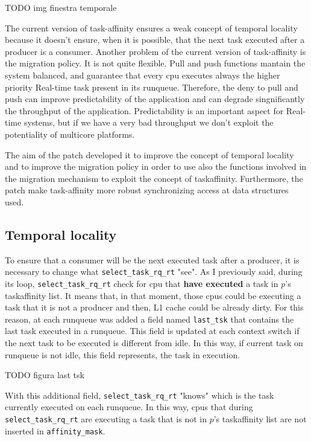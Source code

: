 TODO img finestra temporale

The current version of task-affinity ensures a weak concept of temporal locality because it doesn't ensure, when it is possible, that the next task executed 
after a producer is a consumer. Another problem of the current version of task-affinity is the migration policy. It is not quite flexible. Pull and push 
functions mantain the system balanced, and guarantee that every cpu executes always the higher priority Real-time task present in its runqueue.
Therefore, the deny to pull and push can improve predictability of the application and can degrade singnificantly the throughput of the application.
Predictability is an important aspect for Real-time systems, but if we have a very bad throughput we don't exploit the potentiality of multicore platforms.

The aim of the patch developed it to improve the concept of temporal locality and to improve the migration policy in order to use also the functions 
involved in the migration mechanism to exploit the concept of taskaffinity. Furthermore, the patch make task-affinity more robust synchronizing access at 
data structures used.

\subsection{Temporal locality}

To ensure that a consumer will be the next executed task after a producer, it is necessary to change what \texttt{select\_task\_rq\_rt} "see". As I 
previously said, during its loop, \texttt{select\_task\_rq\_rt} check for cpu that \textbf{have executed} a task in $p$'s taskaffinity list. It means
that, in that moment, those cpus could be executing a task that it is not a producer and then, L1 cache could be already dirty. For this reason, at each
runqueue was added a field named \texttt{last\_tsk} that contains the last task executed in a runqueue. This field is updated at each context switch 
if the next task to be executed is different from idle. In this way, if current task on runqueue is not idle, this field represents, the task in execution. 

TODO figura last tsk

With this additional field, \texttt{select\_task\_rq\_rt} "knows" which is the task currently executed on each runqueue. In this way, cpus that during 
\texttt{select\_task\_rq\_rt} are executing a task that is not in $p$'s taskaffinity list are not inserted in \texttt{affinity\_mask}.

